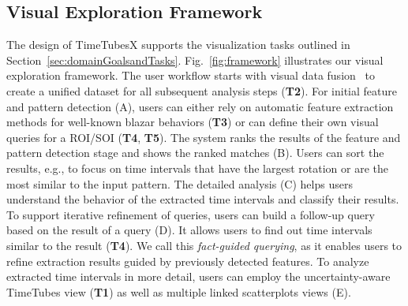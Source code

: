 \subsection{Visual Exploration Framework\label{sec:approach}}
The design of TimeTubesX supports the visualization tasks outlined in Section~\ref{sec:domainGoalsandTasks}.
Fig.~\ref{fig:framework} illustrates our visual exploration framework.
%
The user workflow starts with visual data fusion~\cite{Fujishiro2018} to create a unified dataset for all subsequent analysis steps (\textbf{T2}).
For initial feature and pattern detection (A), users can either rely on automatic feature extraction methods for well-known blazar behaviors (\textbf{T3}) or can define their own visual queries for a ROI/SOI (\textbf{T4}, \textbf{T5}).
The system ranks the results of the feature and pattern detection stage and shows the ranked matches (B).
Users can sort the results, e.g., to focus on time intervals that have the largest rotation or are the most similar to the input pattern.
%
The detailed analysis (C) helps users understand the behavior of the extracted time intervals and classify their results. 
To support iterative refinement of queries, users can build a follow-up query based on the result of a query (D). It allows users to find out time intervals similar to the result (\textbf{T4}).
We call this \textit{fact-guided querying}, as it enables users to refine extraction results guided by previously detected features.
To analyze extracted time intervals in more detail, users can employ
the uncertainty-aware TimeTubes view (\textbf{T1}) as well as multiple linked scatterplots views (E).

